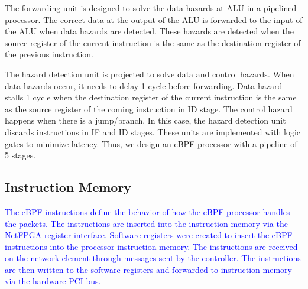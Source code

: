 The forwarding unit is designed to solve the data hazards at ALU in a pipelined processor. The correct data at the output of the ALU is forwarded to the input of the ALU when data hazards are detected. These hazards are detected when the source register of the current instruction is the same as the destination register of the previous instruction.

The hazard detection unit is projected to solve data and control hazards. When data hazards occur, it needs to delay 1 cycle before forwarding.
Data hazard stalls 1 cycle when the destination register of the current instruction is the same as the source register of the coming instruction in ID stage. The control hazard happens when there is a jump/branch. In this case, the hazard detection unit discards instructions in IF and ID stages.
These units are implemented with logic gates to minimize latency.
Thus, we design an eBPF processor with a pipeline of 5 stages.


\subsection{Instruction Memory} 



\textcolor{blue}{The eBPF instructions define the behavior of how the eBPF processor handles the packets. The instructions are inserted into the instruction memory via the NetFPGA register interface. Software registers were created to insert the eBPF instructions into the processor instruction memory. The instructions are received on the network element through messages sent by the controller. The instructions are then written to the software registers and forwarded to instruction memory via the hardware PCI bus.} 

